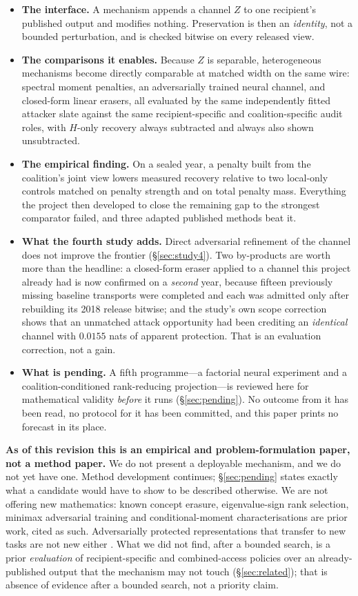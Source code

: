 \documentclass[10pt]{article}
\begin{document}
\begin{itemize}\itemsep1pt
\item \textbf{The interface.} A mechanism appends a channel $Z$ to one recipient's published
output and modifies nothing. Preservation is then an \emph{identity}, not a bounded perturbation,
and is checked bitwise on every released view.
\item \textbf{The comparisons it enables.} Because $Z$ is separable, heterogeneous mechanisms become
directly comparable at matched width on the same wire: spectral moment penalties, an adversarially
trained neural channel, and closed-form linear erasers, all evaluated by the same independently
fitted attacker slate against the same recipient-specific and coalition-specific audit roles, with
$H$-only recovery always subtracted and always also shown unsubtracted.
\item \textbf{The empirical finding.} On a sealed year, a penalty built from the coalition's joint
view lowers measured recovery relative to two local-only controls matched on penalty strength and on
total penalty mass. Everything the project then developed to close the remaining gap to the strongest
comparator failed, and three adapted published methods beat it.
\item \textbf{What the fourth study adds.} Direct adversarial refinement of the channel does not
improve the frontier (\S\ref{sec:study4}). Two by-products are worth more than the headline: a
closed-form eraser applied to a channel this project already had is now confirmed on a \emph{second}
year, because fifteen previously missing baseline transports were completed and each was admitted
only after rebuilding its 2018 release bitwise; and the study's own scope correction shows that an
unmatched attack opportunity had been crediting an \emph{identical} channel with $0.0155$ nats of
apparent protection. That is an evaluation correction, not a gain.
\item \textbf{What is pending.} A fifth programme---a factorial neural experiment and a
coalition-conditioned rank-reducing projection---is reviewed here for mathematical validity
\emph{before} it runs (\S\ref{sec:pending}). No outcome from it has been read, no protocol for it has
been committed, and this paper prints no forecast in its place.
\end{itemize}

\textbf{As of this revision this is an empirical and problem-formulation paper, not a method paper.}
We do not present a deployable mechanism, and we do not yet have one. Method development continues;
\S\ref{sec:pending} states exactly what a candidate would have to show to be described otherwise. We are not offering new mathematics: known concept erasure, eigenvalue-sign
rank selection, minimax adversarial training and conditional-moment characterisations are prior work,
cited as such. Adversarially protected representations that transfer to new tasks are not new either
\citep{madras2018laftr}. What we did not find, after a bounded search, is a prior \emph{evaluation}
of recipient-specific and combined-access policies over an already-published output that the
mechanism may not touch (\S\ref{sec:related}); that is absence of evidence after a bounded search, not
a priority claim.
\end{document}
